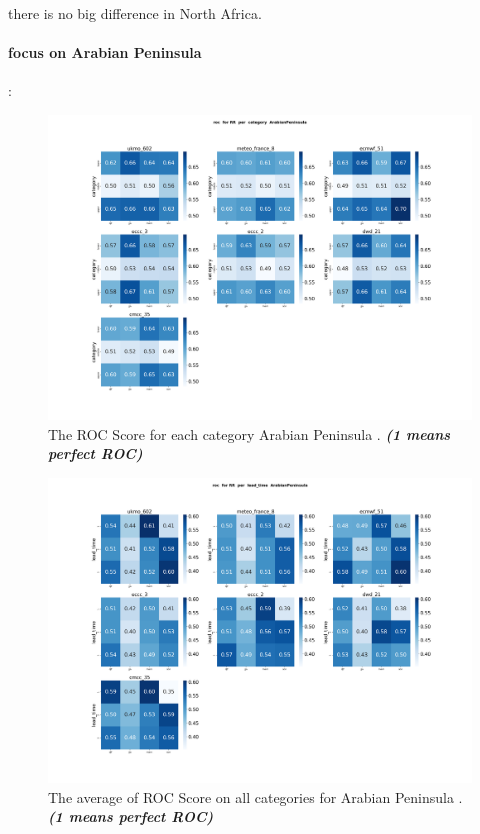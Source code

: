 there is no big difference in North Africa.
	
\paragraph{focus on Arabian Peninsula}:



\begin{figure}[H]
    \centering
    \includegraphics[scale=0.25]{plots/prob/roc/roc_RR_category_ArabianPeninsula.png}
    \caption{The ROC Score for each category Arabian Peninsula . \textbf{\textit{(1 means perfect ROC)}}}
\end{figure}


\begin{figure}[H]
    \centering
    \includegraphics[scale=0.25]{plots/prob/roc/roc_RR_lead_time_ArabianPeninsula.png}
    \caption{The average of  ROC Score on all categories for Arabian Peninsula . \textbf{\textit{(1 means perfect ROC)}}}
\end{figure}


